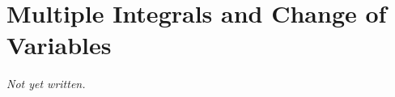 \chapter{Multiple Integrals and Change of Variables}\label{ch:multiple-integrals}


\textit{Not yet written.}
